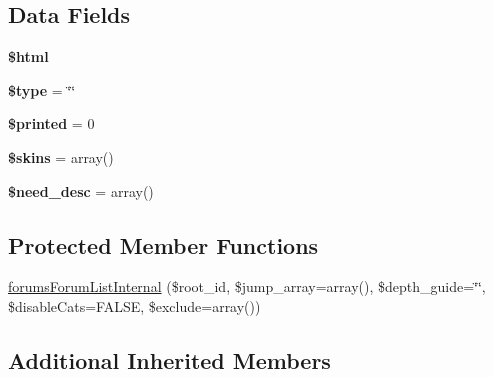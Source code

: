 \subsection*{Data Fields}
\begin{DoxyCompactItemize}
\item 
\hypertarget{classadmin__forum__functions_a6f96e7fc92441776c9d1cd3386663b40}{{\bfseries \$html}}\label{classadmin__forum__functions_a6f96e7fc92441776c9d1cd3386663b40}

\item 
\hypertarget{classadmin__forum__functions_a9a4a6fba2208984cabb3afacadf33919}{{\bfseries \$type} = \char`\"{}\char`\"{}}\label{classadmin__forum__functions_a9a4a6fba2208984cabb3afacadf33919}

\item 
\hypertarget{classadmin__forum__functions_aed69d4505c8733f90f822ae6ed281823}{{\bfseries \$printed} = 0}\label{classadmin__forum__functions_aed69d4505c8733f90f822ae6ed281823}

\item 
\hypertarget{classadmin__forum__functions_a2a44a205e187c7e7155a754ec7d975b7}{{\bfseries \$skins} = array()}\label{classadmin__forum__functions_a2a44a205e187c7e7155a754ec7d975b7}

\item 
\hypertarget{classadmin__forum__functions_ad2e6212184a8d41e8152159deb6c9517}{{\bfseries \$need\-\_\-desc} = array()}\label{classadmin__forum__functions_ad2e6212184a8d41e8152159deb6c9517}

\end{DoxyCompactItemize}
\subsection*{Protected Member Functions}
\begin{DoxyCompactItemize}
\item 
\hyperlink{classadmin__forum__functions_a8c244b277499523617472a4fbcec0dd3}{forums\-Forum\-List\-Internal} (\$root\-\_\-id, \$jump\-\_\-array=array(), \$depth\-\_\-guide=\char`\"{}\char`\"{}, \$disable\-Cats=F\-A\-L\-S\-E, \$exclude=array())
\end{DoxyCompactItemize}
\subsection*{Additional Inherited Members}


